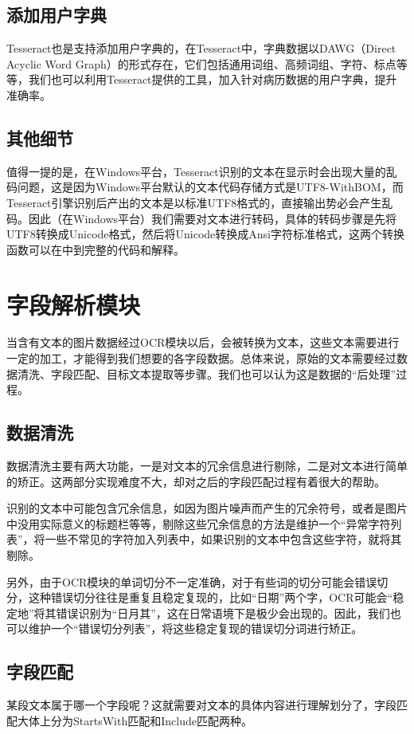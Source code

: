 \subsection{添加用户字典}
Tesseract也是支持添加用户字典的，在Tesseract中，字典数据以DAWG（Direct Acyclic Word Graph）的形式存在，它们包括通用词组、高频词组、字符、标点等等，我们也可以利用Tesseract提供的工具，加入针对病历数据的用户字典，提升准确率。

\subsection{其他细节}
值得一提的是，在Windows平台，Tesseract识别的文本在显示时会出现大量的乱码问题，这是因为Windows平台默认的文本代码存储方式是UTF8-WithBOM，而Tesseract引擎识别后产出的文本是以标准UTF8格式的，直接输出势必会产生乱码。因此（在Windows平台）我们需要对文本进行转码，具体的转码步骤是先将UTF8转换成Unicode格式，然后将Unicode转换成Ansi字符标准格式，这两个转换函数可以在\citep{character-encoding}中到完整的代码和解释。

\section{字段解析模块}  %
当含有文本的图片数据经过OCR模块以后，会被转换为文本，这些文本需要进行一定的加工，才能得到我们想要的各字段数据。总体来说，原始的文本需要经过数据清洗、字段匹配、目标文本提取等步骤。我们也可以认为这是数据的“后处理”过程。

\subsection{数据清洗}
数据清洗主要有两大功能，一是对文本的冗余信息进行剔除，二是对文本进行简单的矫正。这两部分实现难度不大，却对之后的字段匹配过程有着很大的帮助。

识别的文本中可能包含冗余信息，如因为图片噪声而产生的冗余符号，或者是图片中没用实际意义的标题栏等等，剔除这些冗余信息的方法是维护一个“异常字符列表”，将一些不常见的字符加入列表中，如果识别的文本中包含这些字符，就将其剔除。

另外，由于OCR模块的单词切分不一定准确，对于有些词的切分可能会错误切分，这种错误切分往往是重复且稳定复现的，比如“日期”两个字，OCR可能会“稳定地”将其错误识别为“日月其”，这在日常语境下是极少会出现的。因此，我们也可以维护一个“错误切分列表”，将这些稳定复现的错误切分词进行矫正。

\subsection{字段匹配}
某段文本属于哪一个字段呢？这就需要对文本的具体内容进行理解划分了，字段匹配大体上分为StartsWith匹配和Include匹配两种。
